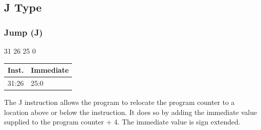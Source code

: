 \documentclass[12pt]{article}
\begin{document}


\newpage
\subsection{J Type}

\subsubsection{Jump (J)}
    
    \hspace{1.5cm}31 \hspace{1.24cm}26 \hspace{.05cm}25 \hspace{10.2cm}0
    \vspace{-.25cm}
    \begin{center}
        \begin{tabular}{ |p{1.8cm}|p{10.7cm}| }
            \hline
            \textbf{Inst.} & \textbf{Immediate}\\
            \hline
            31:26& 25:0\\
            \hline
        \end{tabular}
    \end{center}
    
    \noindent
    The J instruction allows the program to relocate the program counter to a location above or below the instruction. It does so by adding the immediate value supplied to the program counter + 4. The immediate value is sign extended.
    
\end{document}
